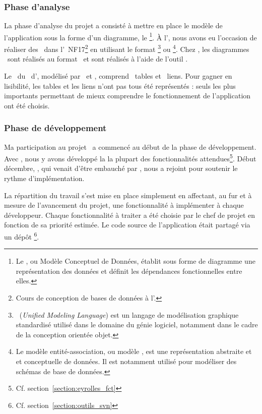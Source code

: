 \subsubsection{Phase d'analyse}

La phase d'analyse du projet a consisté à mettre en place le modèle de l'application sous la forme d'un diagramme, le \emph{\amcd}\footnote{Le \amcd, ou Modèle Conceptuel de Données, établit sous forme de diagramme une représentation des données et définit les dépendances fonctionnelles entre elles.}. À l'\autc, nous avons eu l'occasion de réaliser des \amcds\ dans l'\auv\ NF17\footnote{Cours de conception de bases de données à l'\autc.} en utilisant le format \auml\footnote{\auml\ (\textit{Unified Modeling Language}) est un langage de modélisation graphique standardisé utilisé dans le domaine du génie logiciel, notamment dans le cadre de la conception orientée objet.\cite{uml}} ou \aea\footnote{Le modèle entité-association, ou modèle \aea, est une représentation abstraite et et conceptuelle de données. Il est notamment utilisé pour modéliser des schémas de base de données.\cite{ea}}. Chez \asl, les diagrammes \amcds\ sont réalisés au format \aea\ et sont réalisés à l'aide de l'outil \amysqlwb.

Le \amcd\ du \alotdeux\ d'\aey, modélisé par \acohen\ et \ahamon, comprend ~tables et ~liens. Pour gagner en lisibilité, les tables et les liens n'ont pas tous été représentés : seuls les plus importants permettant de mieux comprendre le fonctionnement de l'application ont été choisis.


\subsubsection{Phase de développement}

Ma participation au projet \aey\ a commencé au début de la phase de développement. Avec \ahamon, nous y avons développé la la plupart des fonctionnalités attendues\footnote{Cf. section~\ref{section:eyrolles_fct}}. Début décembre, \aweistroff, qui venait d'être embauché par \asl, nous a rejoint pour soutenir le rythme d'implémentation.

La répartition du travail s'est mise en place simplement en affectant, au fur et à mesure de l'avancement du projet, une fonctionnalité à implémenter à chaque développeur. Chaque fonctionnalité à traiter a été choisie par le chef de projet en fonction de sa priorité estimée. Le code source de l'application était partagé via un dépôt \asvn\footnote{Cf. section~\ref{section:outils_svn}}.

